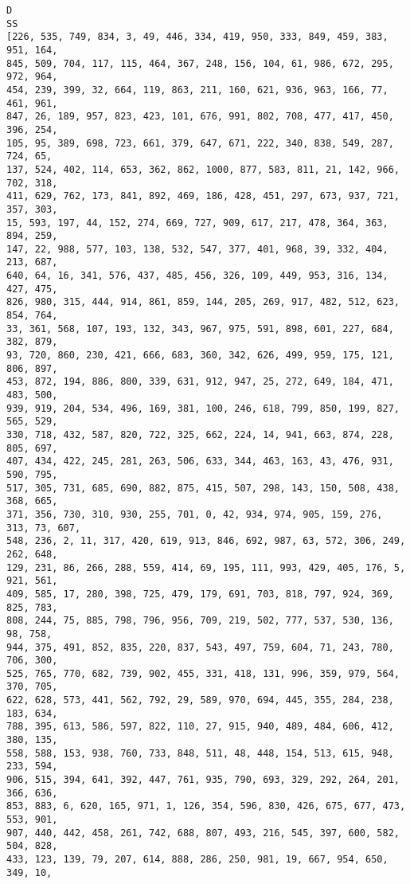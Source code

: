 \documentclass[11pt]{article}
\begin{document}
    \begin{Verbatim}[commandchars=\\\{\}]
D
SS
[226, 535, 749, 834, 3, 49, 446, 334, 419, 950, 333, 849, 459, 383, 951, 164,
845, 509, 704, 117, 115, 464, 367, 248, 156, 104, 61, 986, 672, 295, 972, 964,
454, 239, 399, 32, 664, 119, 863, 211, 160, 621, 936, 963, 166, 77, 461, 961,
847, 26, 189, 957, 823, 423, 101, 676, 991, 802, 708, 477, 417, 450, 396, 254,
105, 95, 389, 698, 723, 661, 379, 647, 671, 222, 340, 838, 549, 287, 724, 65,
137, 524, 402, 114, 653, 362, 862, 1000, 877, 583, 811, 21, 142, 966, 702, 318,
411, 629, 762, 173, 841, 892, 469, 186, 428, 451, 297, 673, 937, 721, 357, 303,
15, 593, 197, 44, 152, 274, 669, 727, 909, 617, 217, 478, 364, 363, 894, 259,
147, 22, 988, 577, 103, 138, 532, 547, 377, 401, 968, 39, 332, 404, 213, 687,
640, 64, 16, 341, 576, 437, 485, 456, 326, 109, 449, 953, 316, 134, 427, 475,
826, 980, 315, 444, 914, 861, 859, 144, 205, 269, 917, 482, 512, 623, 854, 764,
33, 361, 568, 107, 193, 132, 343, 967, 975, 591, 898, 601, 227, 684, 382, 879,
93, 720, 860, 230, 421, 666, 683, 360, 342, 626, 499, 959, 175, 121, 806, 897,
453, 872, 194, 886, 800, 339, 631, 912, 947, 25, 272, 649, 184, 471, 483, 500,
939, 919, 204, 534, 496, 169, 381, 100, 246, 618, 799, 850, 199, 827, 565, 529,
330, 718, 432, 587, 820, 722, 325, 662, 224, 14, 941, 663, 874, 228, 805, 697,
407, 434, 422, 245, 281, 263, 506, 633, 344, 463, 163, 43, 476, 931, 590, 795,
517, 305, 731, 685, 690, 882, 875, 415, 507, 298, 143, 150, 508, 438, 368, 665,
371, 356, 730, 310, 930, 255, 701, 0, 42, 934, 974, 905, 159, 276, 313, 73, 607,
548, 236, 2, 11, 317, 420, 619, 913, 846, 692, 987, 63, 572, 306, 249, 262, 648,
129, 231, 86, 266, 288, 559, 414, 69, 195, 111, 993, 429, 405, 176, 5, 921, 561,
409, 585, 17, 280, 398, 725, 479, 179, 691, 703, 818, 797, 924, 369, 825, 783,
808, 244, 75, 885, 798, 796, 956, 709, 219, 502, 777, 537, 530, 136, 98, 758,
944, 375, 491, 852, 835, 220, 837, 543, 497, 759, 604, 71, 243, 780, 706, 300,
525, 765, 770, 682, 739, 902, 455, 331, 418, 131, 996, 359, 979, 564, 370, 705,
622, 628, 573, 441, 562, 792, 29, 589, 970, 694, 445, 355, 284, 238, 183, 634,
788, 395, 613, 586, 597, 822, 110, 27, 915, 940, 489, 484, 606, 412, 380, 135,
558, 588, 153, 938, 760, 733, 848, 511, 48, 448, 154, 513, 615, 948, 233, 594,
906, 515, 394, 641, 392, 447, 761, 935, 790, 693, 329, 292, 264, 201, 366, 636,
853, 883, 6, 620, 165, 971, 1, 126, 354, 596, 830, 426, 675, 677, 473, 553, 901,
907, 440, 442, 458, 261, 742, 688, 807, 493, 216, 545, 397, 600, 582, 504, 828,
433, 123, 139, 79, 207, 614, 888, 286, 250, 981, 19, 667, 954, 650, 349, 10,

\end{Verbatim}
\end{document}
